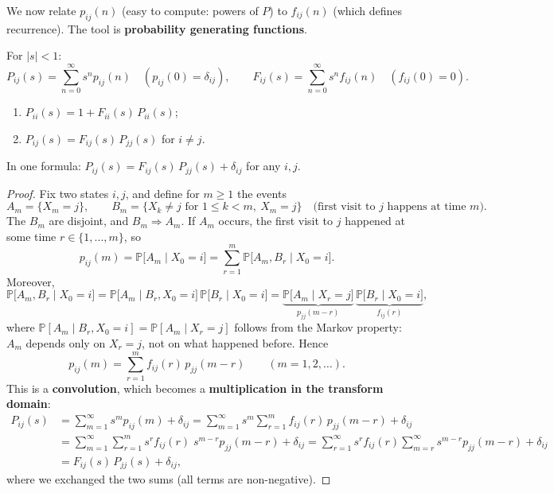 We now relate $p_{ij}(n)$ (easy to compute: powers of $P$) to $f_{ij}(n)$ (which defines recurrence). The tool is \textbf{probability generating functions}.

\begin{definition}
For $|s| < 1$:
\[
P_{ij}(s) = \sum_{n=0}^\infty s^n p_{ij}(n) \quad (p_{ij}(0) = \delta_{ij}), \qquad F_{ij}(s) = \sum_{n=0}^\infty s^n f_{ij}(n) \quad (f_{ij}(0) = 0).
\]
\end{definition}

\begin{theorem}
\begin{enumerate}
    \item[(a)] $P_{ii}(s) = 1 + F_{ii}(s)\,P_{ii}(s)$;
    \item[(b)] $P_{ij}(s) = F_{ij}(s)\,P_{jj}(s)$ for $i \neq j$.
\end{enumerate}
In one formula: $P_{ij}(s) = F_{ij}(s)\,P_{jj}(s) + \delta_{ij}$ for any $i, j$.
\end{theorem}

\begin{proof}
Fix two states $i, j$, and define for $m \geq 1$ the events
\[
A_m = \{X_m = j\}, \qquad B_m = \{X_k \neq j \text{ for } 1 \leq k < m,\ X_m = j\} \quad \text{(first visit to $j$ happens at time $m$)}.
\]
The $B_m$ are disjoint, and $B_m \Rightarrow A_m$. If $A_m$ occurs, the first visit to $j$ happened at some time $r \in \{1, \dots, m\}$, so
\[
p_{ij}(m) = \mathbb{P}\big[A_m \mid X_0 = i\big] = \sum_{r=1}^m \mathbb{P}\big[A_m, B_r \mid X_0 = i\big].
\]
Moreover,
\[
\mathbb{P}\big[A_m, B_r \mid X_0 = i\big] = \mathbb{P}\big[A_m \mid B_r, X_0 = i\big]\,\mathbb{P}\big[B_r \mid X_0 = i\big] = \underbrace{\mathbb{P}\big[A_m \mid X_r = j\big]}_{p_{jj}(m-r)}\,\underbrace{\mathbb{P}\big[B_r \mid X_0 = i\big]}_{f_{ij}(r)},
\]
where $\mathbb{P}[A_m \mid B_r, X_0 = i] = \mathbb{P}[A_m \mid X_r = j]$ follows from the Markov property: $A_m$ depends only on $X_r = j$, not on what happened before. Hence
\[
p_{ij}(m) = \sum_{r=1}^m f_{ij}(r)\, p_{jj}(m - r) \qquad (m = 1, 2, \dots).
\]
This is a \textbf{convolution}, which becomes a \textbf{multiplication in the transform domain}:
\begin{align*}
P_{ij}(s) &= \sum_{m=1}^\infty s^m p_{ij}(m) + \delta_{ij}
= \sum_{m=1}^\infty s^m \sum_{r=1}^m f_{ij}(r)\, p_{jj}(m-r) + \delta_{ij} \\
&= \sum_{m=1}^\infty \sum_{r=1}^m s^r f_{ij}(r)\; s^{m-r} p_{jj}(m-r) + \delta_{ij}
= \sum_{r=1}^\infty s^r f_{ij}(r) \sum_{m=r}^\infty s^{m-r} p_{jj}(m-r) + \delta_{ij} \\
&= F_{ij}(s)\, P_{jj}(s) + \delta_{ij},
\end{align*}
where we exchanged the two sums (all terms are non-negative).
\end{proof}

